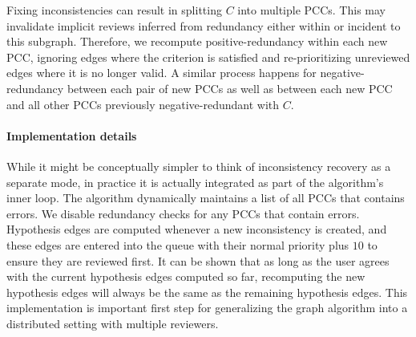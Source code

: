 Fixing inconsistencies can result in splitting $C$ into multiple PCCs.
This may invalidate implicit reviews inferred from redundancy either within or incident to this subgraph.
Therefore, we recompute positive-redundancy within each new PCC, ignoring edges where the criterion is satisfied
  and re-prioritizing unreviewed edges where it is no longer valid.
A similar process happens for negative-redundancy between each pair of new PCCs as well as between each new PCC
  and all other PCCs previously negative-redundant with $C$.

\paragraph{Implementation details}
While it might be conceptually simpler to think of inconsistency recovery as a separate mode, in practice it is
  actually integrated as part of the algorithm's inner loop.
The algorithm dynamically maintains a list of all PCCs that contains errors.
We disable redundancy checks for any PCCs that contain errors.
Hypothesis edges are computed whenever a new inconsistency is created, and these edges are entered into the queue
  with their normal priority plus $10$ to ensure they are reviewed first.
It can be shown that as long as the user agrees with the current hypothesis edges computed so far, recomputing
  the new hypothesis edges will always be the same as the remaining hypothesis edges.
This implementation is important first step for generalizing the graph algorithm into a distributed setting with
  multiple reviewers.







